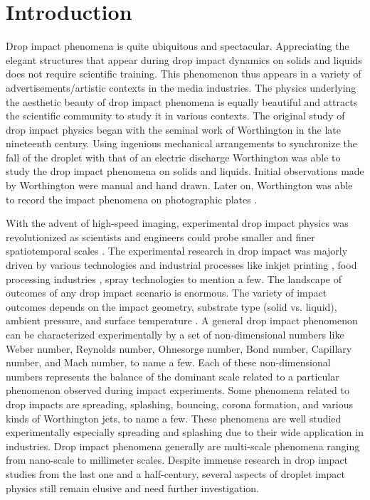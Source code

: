 \documentclass{jfm}
\begin{document}
\section{Introduction}
Drop impact phenomena is quite ubiquitous and spectacular. Appreciating the elegant structures that appear during drop impact dynamics on solids and liquids does not require scientific training. This phenomenon thus appears in a variety of advertisements/artistic contexts in the media industries. The physics underlying the aesthetic beauty of drop impact phenomena is equally beautiful and attracts the scientific community to study it in various contexts. The original study of drop impact physics began with the seminal work of Worthington \citep{worthington1877xxviii,worthington1877second,worthington1883impact} in the late nineteenth century. Using ingenious mechanical arrangements to synchronize the fall of the droplet with that of an electric discharge Worthington was able to study the drop impact phenomena on solids and liquids. Initial observations made by Worthington were manual and hand drawn. Later on, Worthington was able to record the impact phenomena on photographic plates \citep{worthington1897v,worthington1900iv}. 

With the advent of high-speed imaging, experimental drop impact physics was revolutionized as scientists and engineers could probe smaller and finer spatiotemporal scales \citep{thoroddsen2008high,yarin2017collision}. The experimental research in drop impact was majorly driven by various technologies and industrial processes like inkjet printing \citep{wijshoff2018drop,lohse2022fundamental}, food processing industries \citep{andrade2013drop}, spray technologies \citep{breitenbach2017heat,breitenbach2018drop} to mention a few. The landscape of outcomes of any drop impact scenario is enormous.
The variety of impact outcomes depends on the impact geometry, substrate type (solid vs. liquid), ambient pressure, and surface temperature \citep{yarin2006drop,xu2005drop,roy2019dynamics,roy2023mechanics}. 
A general drop impact phenomenon can be characterized experimentally by a set of non-dimensional numbers like Weber number, Reynolds number, Ohnesorge number, Bond number, Capillary number, and Mach number, to name a few. Each of these non-dimensional numbers represents the balance of the dominant scale related to a particular phenomenon observed during impact experiments. Some phenomena related to drop impacts are spreading, splashing, bouncing, corona formation, and various kinds of Worthington jets, to name a few. These phenomena are well studied experimentally \cite{yarin2017collision,thoroddsen2012micro} especially spreading and splashing due to their wide application in industries. Drop impact phenomena generally are multi-scale phenomena ranging from nano-scale \citep{li2015probing,de2015wettability} to millimeter scales. Despite immense research in drop impact studies from the last one and a half-century, several aspects of droplet impact physics still remain elusive and need further investigation.
\end{document}

